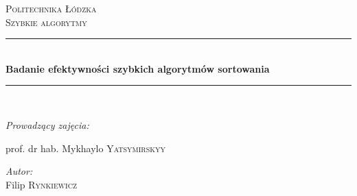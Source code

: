 \begin{titlepage}

\newcommand{\HRule}{\rule{\linewidth}{0.5mm}} %

\center %
 

\textsc{\LARGE Politechnika Łódzka}\\[1.5cm] %
\textsc{\Large Szybkie algorytmy}\\[0.5cm] %


\HRule \\[0.4cm]
{ \huge \bfseries Badanie efektywności szybkich algorytmów sortowania  }\\[0.4cm] %
\HRule \\[1.5cm]
 



\begin{flushleft}\large

\begin{center} \emph{Prowadzący zajęcia:} \end{center}
\begin{center}
prof. dr hab. Mykhaylo \textsc{Yatsymirskyy}
\end{center} %
\end{flushleft}


\Large \emph{Autor:}\\
Filip \textsc{Rynkiewicz}\\[2cm] %




\end{titlepage}
